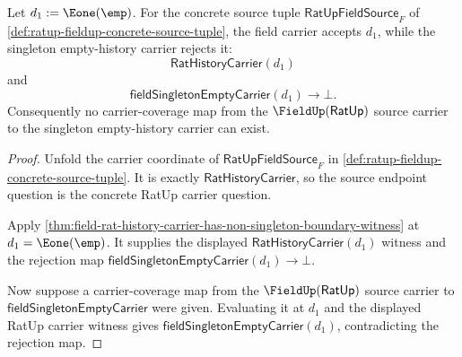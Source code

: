 \begin{theorem}
\label{thm:ratup-fieldup-source-non-singleton-witness}
Let $d_1:=\Eone(\emp)$. For the concrete source tuple
$\mathsf{RatUpFieldSource}_F$ of
\autoref{def:ratup-fieldup-concrete-source-tuple}, the field carrier accepts
$d_1$, while the singleton empty-history carrier rejects it:
$$
\mathsf{RatHistoryCarrier}(d_1)
$$
and
$$
\mathsf{fieldSingletonEmptyCarrier}(d_1)\to\bot.
$$
Consequently no carrier-coverage map from the $\FieldUp(\mathsf{RatUp})$
source carrier to the singleton empty-history carrier can exist.
\end{theorem}
\begin{proof}
Unfold the carrier coordinate of $\mathsf{RatUpFieldSource}_F$ in
\autoref{def:ratup-fieldup-concrete-source-tuple}. It is exactly
$\mathsf{RatHistoryCarrier}$, so the source endpoint question is the concrete
RatUp carrier question.

Apply
\autoref{thm:field-rat-history-carrier-has-non-singleton-boundary-witness} at
$d_1=\Eone(\emp)$. It supplies the displayed
$\mathsf{RatHistoryCarrier}(d_1)$ witness and the rejection map
$\mathsf{fieldSingletonEmptyCarrier}(d_1)\to\bot$.

Now suppose a carrier-coverage map from the $\FieldUp(\mathsf{RatUp})$ source
carrier to $\mathsf{fieldSingletonEmptyCarrier}$ were given. Evaluating it at
$d_1$ and the displayed RatUp carrier witness gives
$\mathsf{fieldSingletonEmptyCarrier}(d_1)$, contradicting the rejection map.
\end{proof}

